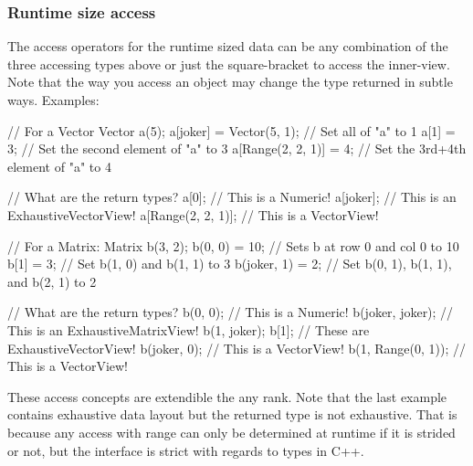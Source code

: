 \subsubsection{Runtime size access}
The access operators for the runtime sized data can be any combination of the 
three accessing types above or just the square-bracket to access the inner-view.
Note that the way you access an object may change the type returned in subtle ways.
Examples:
\begin{code}
// For a Vector
Vector a(5);
a[joker] = Vector(5, 1);  // Set all of "a" to 1
a[1] = 3;  // Set the second element of "a" to 3
a[Range(2, 2, 1)] = 4;  // Set the 3rd+4th element of "a" to 4

// What are the return types?
a[0];  // This is a Numeric!
a[joker];  // This is an ExhaustiveVectorView!
a[Range(2, 2, 1)];  // This is a VectorView!

// For a Matrix:
Matrix b(3, 2);
b(0, 0) = 10;  // Sets b at row 0 and col 0 to 10
b[1] = 3;  // Set b(1, 0) and b(1, 1) to 3
b(joker, 1) = 2;  // Set b(0, 1), b(1, 1), and b(2, 1) to 2

// What are the return types?
b(0, 0);  // This is a Numeric!
b(joker, joker);  // This is an ExhaustiveMatrixView!
b(1, joker);
b[1];  // These are ExhaustiveVectorView!
b(joker, 0);  // This is a VectorView!
b(1, Range(0, 1));  // This is a VectorView! 
\end{code}
These access concepts are extendible the any rank.  Note that the last example contains
exhaustive data layout but the returned type is not exhaustive.  That is because any access
with range can only be determined at runtime if it is strided or not, but the interface
is strict with regards to types in C++.

